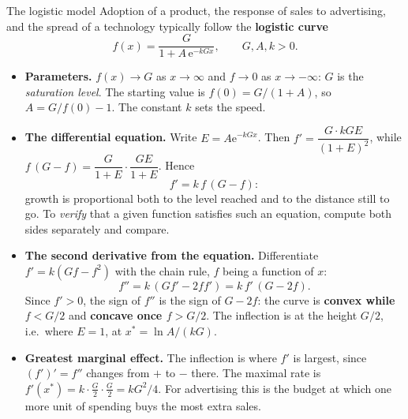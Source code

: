 \begin{rulebox}{The logistic model}
Adoption of a product, the response of sales to advertising, and the
spread of a technology typically follow the \textbf{logistic curve}
\[
  f(x)=\frac{G}{1+A\,\mathrm{e}^{-kGx}},\qquad G,A,k>0 .
\]
\begin{itemize}[leftmargin=1.6em,itemsep=0.4ex]
  \item \textbf{Parameters.} $f(x)\to G$ as $x\to\infty$ and $f\to0$ as
        $x\to-\infty$: $G$ is the \emph{saturation level}. The starting
        value is $f(0)=G/(1+A)$, so $A=G/f(0)-1$. The constant $k$ sets the
        speed.
  \item \textbf{The differential equation.} Write $E=A\mathrm{e}^{-kGx}$.
        Then $f'=\dfrac{G\cdot kGE}{(1+E)^{2}}$, while
        $f\,(G-f)=\dfrac{G}{1+E}\cdot\dfrac{GE}{1+E}$. Hence
        \[
          f'=k\,f\,(G-f):
        \]
        growth is proportional both to the level reached and to the
        distance still to go. To \emph{verify} that a given function
        satisfies such an equation, compute both sides separately and
        compare.
  \item \textbf{The second derivative from the equation.} Differentiate
        $f'=k(Gf-f^{2})$ with the chain rule, $f$ being a function of $x$:
        \[
          f''=k\,(Gf'-2ff')=k\,f'\,(G-2f) .
        \]
        Since $f'>0$, the sign of $f''$ is the sign of $G-2f$: the curve is
        \textbf{convex while $f<G/2$} and \textbf{concave once $f>G/2$}.
        The inflection is at the height $G/2$, i.e.\ where $E=1$, at
        $x^{*}=\ln A/(kG)$.
  \item \textbf{Greatest marginal effect.} The inflection is where $f'$ is
        largest, since $(f')'=f''$ changes from $+$ to $-$ there. The
        maximal rate is $f'(x^{*})=k\cdot\frac G2\cdot\frac G2=kG^{2}/4$.
        For advertising this is the budget at which one more unit of spending
        buys the most extra sales.
\end{itemize}
\end{rulebox}

